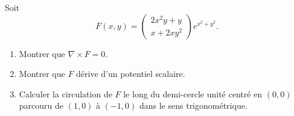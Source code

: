 
\begin{exercice}\label{exoOutilsMath-0068}

    Soit
    \begin{equation}
        F(x,y)=\begin{pmatrix}
            2x^2y+y    \\ 
            x+2xy^2    
        \end{pmatrix} e^{x^2+y^2}.
    \end{equation}
    \begin{enumerate}
        \item
            Montrer que $\nabla\times F=0$.
        \item
            Montrer que $F$ dérive d'un potentiel scalaire.
        \item
            Calculer la circulation de $F$ le long du demi-cercle unité centré en $(0,0)$ parcouru de $(1,0)$ à $(-1,0)$ dans le sens trigonométrique.
    \end{enumerate}

\end{exercice}
